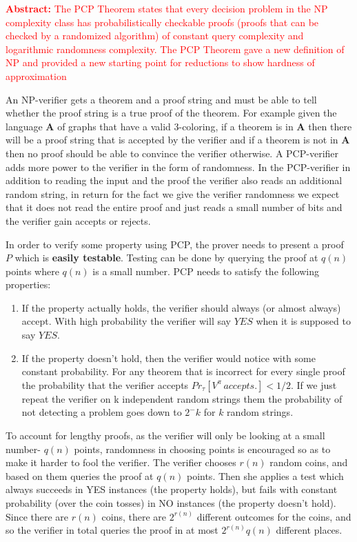 \textcolor{red}{\textbf{Abstract:} The PCP Theorem states that every decision problem in the NP complexity class has probabilistically checkable proofs (proofs that can be checked by a randomized algorithm) of constant query complexity and logarithmic randomness complexity. The PCP Theorem gave a new definition of NP and provided a new starting point for reductions to show hardness of approximation}

An NP-verifier gets a theorem and a proof string and must be able to tell whether the proof string is a true proof of the theorem. For example given the language $\bm{A}$ of graphs that have a valid 3-coloring, if a theorem is in $\bm{A}$ then there will be a proof string that is accepted by the verifier and if a theorem is not in $\bm{A}$ then no proof should be able to convince the verifier otherwise. A PCP-verifier adds more power to the verifier in the form of randomness. In the PCP-verifier in addition to reading the input and the proof the verifier also reads an additional random string, in return for the fact we give the verifier randomness we expect that it does not read the entire proof and just reads a small number of bits and the verifier gain accepts or rejects.

In order to verify some property using PCP, the prover needs to present a proof $P$ which is \textbf{easily testable}. Testing can be done by querying the proof at $q(n)$ points where $q(n)$ is a small number. PCP needs to satisfy the following properties: 
\begin{enumerate}[nolistsep]
    \item If the property actually holds, the verifier should always (or almost always) accept. With high probability the verifier will say $YES$ when it is supposed to say $YES$.
    \item If the property doesn't hold, then the verifier would notice with some constant probability. For any theorem that is incorrect for every single proof the probability that the verifier accepts $Pr_{\tau}[V^{\pi}\,accepts.] < 1/2$. If we just repeat the verifier on k independent random strings them the probability of not detecting a problem goes down to $2^-k$ for $k$ random strings.
\end{enumerate}

To account for lengthy proofs, as the verifier will only be looking at a small number- $q(n)$ points, randomness in choosing points is encouraged so as to make it harder to fool the verifier. The verifier chooses $r(n)$ random coins, and based on them queries the proof at $q(n)$ points. Then she applies a test which always succeeds in YES instances (the property holds), but fails with constant probability (over the coin tosses) in NO instances (the property doesn't hold). Since there are $r(n)$ coins, there are $2^{r(n)}$ different outcomes for the coins, and so the verifier in total queries the proof in at most $2^{r(n)}q(n)$ different places.

